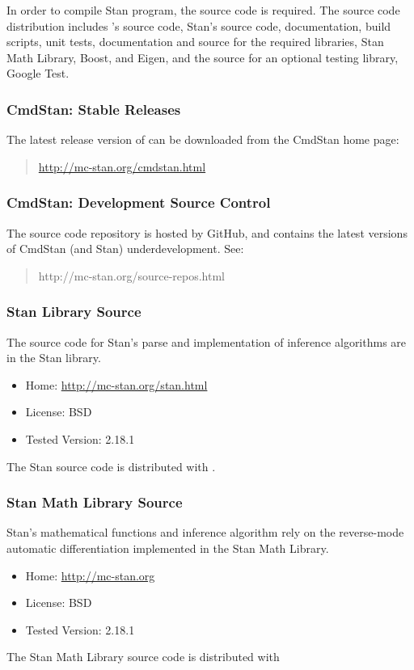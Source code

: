 In order to compile Stan program, the \CmdStan source code is
required.  The \CmdStan source code distribution includes \CmdStan's
source code, Stan's source code, documentation, build scripts, unit
tests, documentation and source for the required libraries, Stan Math
Library, Boost, and Eigen, and the source for an optional testing
library, Google Test.

\subsubsection{CmdStan: Stable Releases}

The latest release version of \CmdStan can be downloaded
from the CmdStan home page:
%
\begin{quote}
\url{http://mc-stan.org/cmdstan.html}
\end{quote}
%

\subsubsection{CmdStan: Development Source Control}

The source code repository is hosted by GitHub, and contains the
latest versions of CmdStan (and Stan) underdevelopment.  See:
%
\begin{quote}
http://mc-stan.org/source-repos.html
\end{quote}

\subsubsection{Stan Library Source}

The source code for Stan's parse and implementation of inference
algorithms are in the Stan library.
%
\begin{itemize}
\item Home: \url{http://mc-stan.org/stan.html}
\item License: BSD
\item Tested Version: 2.18.1
\end{itemize}
%
The Stan source code is distributed with \CmdStan.

\subsubsection{Stan Math Library Source}

Stan's mathematical functions and inference algorithm rely on the
reverse-mode automatic differentiation implemented in the Stan Math
Library.
%
\begin{itemize}
\item Home: \url{http://mc-stan.org}
\item License: BSD
\item Tested Version: 2.18.1
\end{itemize}
%
The Stan Math Library source code is distributed with \CmdStan

